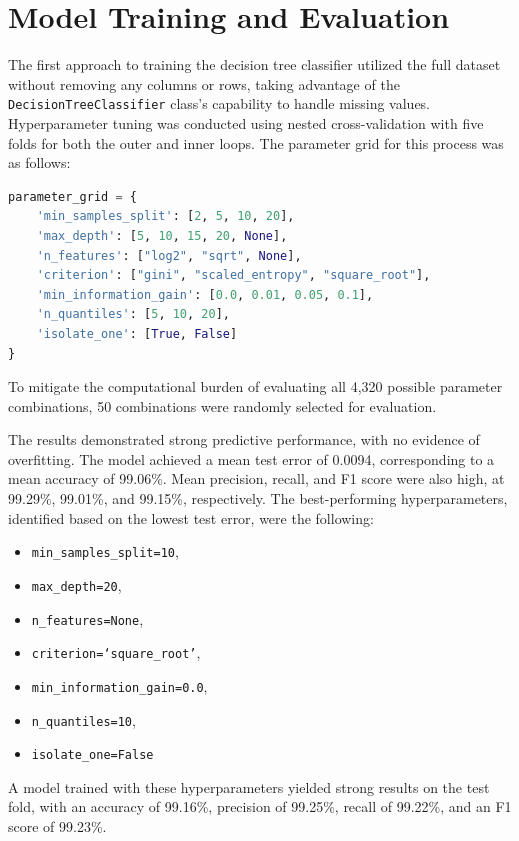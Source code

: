 \documentclass{article}
\begin{document}
\section{Model Training and Evaluation}

The first approach to training the decision tree classifier utilized the full dataset without removing any columns or rows, taking advantage of the \texttt{DecisionTreeClassifier} class's capability to handle missing values. Hyperparameter tuning was conducted using nested cross-validation with five folds for both the outer and inner loops. The parameter grid for this process was as follows:

\begin{lstlisting}[language=Python]
parameter_grid = {
    'min_samples_split': [2, 5, 10, 20],
    'max_depth': [5, 10, 15, 20, None],
    'n_features': ["log2", "sqrt", None],
    'criterion': ["gini", "scaled_entropy", "square_root"],
    'min_information_gain': [0.0, 0.01, 0.05, 0.1],
    'n_quantiles': [5, 10, 20],
    'isolate_one': [True, False]
}
\end{lstlisting}

\noindent To mitigate the computational burden of evaluating all 4,320 possible parameter combinations, 50 combinations were randomly selected for evaluation.

The results demonstrated strong predictive performance, with no evidence of overfitting. The model achieved a mean test error of 0.0094, corresponding to a mean accuracy of 99.06\%. Mean precision, recall, and F1 score were also high, at 99.29\%, 99.01\%, and 99.15\%, respectively. The best-performing hyperparameters, identified based on the lowest test error, were the following:\
\begin{itemize}
\item \texttt{min\_samples\_split=10},
\item \texttt{max\_depth=20},
\item \texttt{n\_features=None},
\item \texttt{criterion=`square\_root'},
\item \texttt{min\_information\_gain=0.0},
\item \texttt{n\_quantiles=10},
\item \texttt{isolate\_one=False}
\end{itemize}

\noindent A model trained with these hyperparameters yielded strong results on the test fold, with an accuracy of 99.16\%, precision of 99.25\%, recall of 99.22\%, and an F1 score of 99.23\%.
\end{document}
